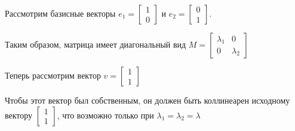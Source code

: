 \documentclass[a4paper,14pt]{extarticle}
\begin{document}
Рассмотрим базисные векторы
\(e_1 = \begin{bmatrix} 1 \\ 0 \end{bmatrix}\) и
\(e_2 = \begin{bmatrix} 0 \\ 1 \end{bmatrix}\).
\begin{center}\end{center}
\begin{center}\end{center}

Таким образом, матрица имеет диагональный вид
\(M = \begin{bmatrix} \lambda_1 & 0 \\ 0 & \lambda_2 \end{bmatrix}\)

Теперь рассмотрим вектор \(v = \begin{bmatrix} 1 \\ 1 \end{bmatrix}\)
\begin{center}\end{center}

Чтобы этот вектор был собственным, он должен быть коллинеарен исходному
вектору \(\begin{bmatrix} 1 \\ 1 \end{bmatrix}\), что возможно только
при \(\lambda_1 = \lambda_2 = \lambda\)
\begin{center}\end{center}
\end{document}
